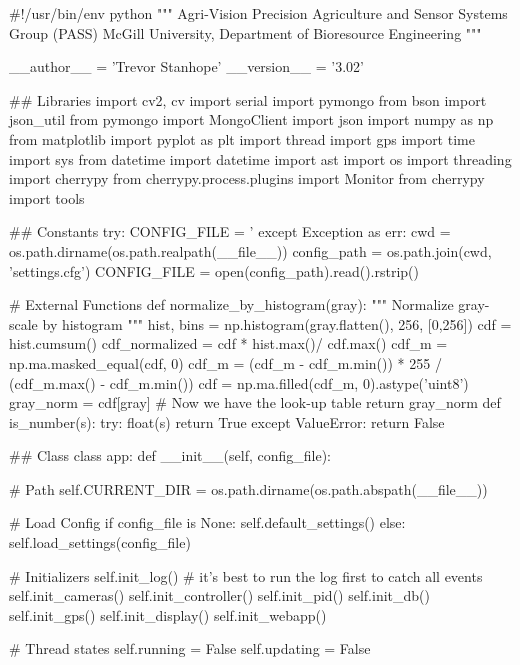 \begin{python}
#!/usr/bin/env python
"""
Agri-Vision
Precision Agriculture and Sensor Systems Group (PASS)
McGill University, Department of Bioresource Engineering
"""

__author__ = 'Trevor Stanhope'
__version__ = '3.02'

## Libraries
import cv2, cv
import serial
import pymongo
from bson import json_util
from pymongo import MongoClient
import json
import numpy as np
from matplotlib import pyplot as plt
import thread
import gps
import time 
import sys
from datetime import datetime
import ast
import os
import threading
import cherrypy
from cherrypy.process.plugins import Monitor
from cherrypy import tools

## Constants
try:
    CONFIG_FILE = '%
except Exception as err:
    cwd = os.path.dirname(os.path.realpath(__file__))
    config_path = os.path.join(cwd, 'settings.cfg')
    CONFIG_FILE = open(config_path).read().rstrip()

# External Functions
def normalize_by_histogram(gray):
    """
    Normalize gray-scale by histogram
    """
    hist, bins = np.histogram(gray.flatten(), 256, [0,256])
    cdf = hist.cumsum()
    cdf_normalized = cdf * hist.max()/ cdf.max()
    cdf_m = np.ma.masked_equal(cdf, 0)
    cdf_m = (cdf_m - cdf_m.min()) * 255 / (cdf_m.max() - cdf_m.min())
    cdf = np.ma.filled(cdf_m, 0).astype('uint8')
    gray_norm = cdf[gray] # Now we have the look-up table
    return gray_norm
def is_number(s):
    try:
        float(s)
        return True
    except ValueError:
        return False

## Class
class app:
    def __init__(self, config_file):

        # Path
        self.CURRENT_DIR = os.path.dirname(os.path.abspath(__file__))

        # Load Config
        if config_file is None:
            self.default_settings()
        else:
            self.load_settings(config_file)
        
        # Initializers
        self.init_log() # it's best to run the log first to catch all events
        self.init_cameras()
        self.init_controller()
        self.init_pid()
        self.init_db()
        self.init_gps()
        self.init_display()
        self.init_webapp()

        # Thread states
        self.running = False
        self.updating = False


\end{python}
